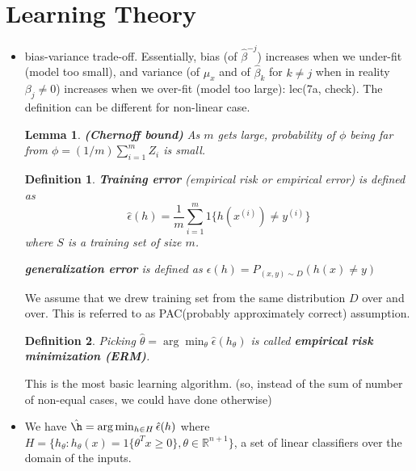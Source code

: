 \documentclass{article}
\newtheorem{lemma}[theorem]{Lemma}
\newtheorem{definition}{Definition}
\theoremstyle{remark}
\begin{document}
\section*{Learning Theory}
\begin{itemize}
\item bias-variance trade-off. Essentially, bias (of $\hat\beta^{-j}$) increases when we under-fit (model too small), and variance (of $\mu_x$ and of $\hat\beta_k$ for $k\neq j$ when in reality $\beta_j\neq 0$) increases when we over-fit (model too large):
lec(7a, check). The definition can be different for non-linear case.
\begin{lemma}
\textbf{(Chernoff bound)} As $m$ gets large, probability of $\phi$ being far from $\phi=(1/m)\sum^m_{i=1}Z_i$ is small.
\end{lemma}

\begin{definition}
\textbf{Training error} (empirical risk or empirical error) is defined as $$\hat\epsilon(h)=\frac 1 m\sum^m_{i=1}1\{h(x^{(i)})\neq y^{(i)}\}$$ where $S$ is a training set of size $m$.

\textbf{generalization error} is defined as $\epsilon(h)=P_{(x,y)\sim D}(h(x)\neq y)$
\end{definition}
We assume that we drew training set from the same distribution $D$ over and over. This is referred to as PAC(probably approximately correct) assumption.

\begin{definition}
Picking $\hat\theta=\arg\min_\theta \hat\epsilon(h_\theta)$ is called \textbf{empirical risk minimization (ERM)}.
\end{definition}
This is the most basic learning algorithm. (so, instead of the sum of number of non-equal cases, we could have done otherwise)

\item We have $\hat\h=\arg\min_{h\in H}\hat\epsilon (h)$ where $H=\{h_\theta:h_\theta (x)=1\{\theta^T x\geq 0\}, \theta\in\mathbb R^{n+1}\}$, a set of linear classifiers over the domain of the inputs.
\end{itemize}


















\newpage
\end{document}
